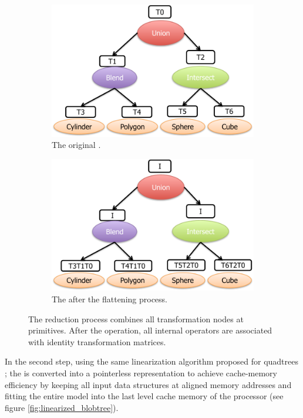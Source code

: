 \begin{figure}[H]
\centering
\begin{subfigure}{.5\textwidth}
  \centering
  \includegraphics[width=1.0\linewidth]{figures/cpupoly/blob_original.pdf}
  \caption{The original \blob.}
  \label{fig:sub1}
\end{subfigure}%
\begin{subfigure}{.5\textwidth}
  \centering
  \includegraphics[width=1.0\linewidth]{figures/cpupoly/blob_combined.pdf}
  \caption{The \blob after the flattening process.}
  \label{fig:sub2}
\end{subfigure}
\caption{The reduction process combines all transformation nodes at primitives. After the operation, all internal operators 
are associated with identity transformation matrices.}
\label{fig:combinetransforms}
\end{figure}


In the second step, using the same linearization algorithm proposed for quadtrees \cite{Lee2000}; the \blob is converted into 
a pointerless representation to achieve cache-memory efficiency by keeping all input data structures at 
aligned memory addresses and fitting the entire \blob model into the last level cache memory of the processor 
(see figure \ref{fig:linearized_blobtree}). 


